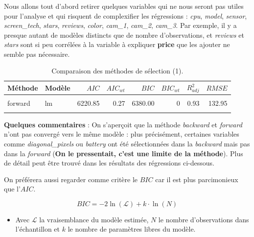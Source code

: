 \documentclass[
  12pt,
]{report}
\providecommand{\tightlist}{%
  \setlength{\itemsep}{0pt}\setlength{\parskip}{0pt}}\usepackage{longtable,booktabs,array}
\begin{document}
Nous allons tout d'abord retirer quelques variables qui ne nous seront
pas utiles pour l'analyse et qui risquent de complexifier les
régressions : \emph{cpu}, \emph{model}, \emph{sensor},
\emph{screen\_tech}, \emph{stars}, \emph{reviews}, \emph{color},
\emph{cam\_1}, \emph{cam\_2}, \emph{cam\_3}. Par exemple, il y a presque
autant de modèles distincts que de nombre d'observations, et
\emph{reviews} et \emph{stars} sont si peu corrélées à la variable à
expliquer \textbf{price} que les ajouter ne semble pas nécessaire.

\begin{table}[!h]

\caption{\label{tab:kable_perf}Comparaison des méthodes de sélection (1).}
\centering
\begin{tabular}[t]{llrrrrrr}
\toprule
\textbf{Méthode} & \textbf{Modèle} & \textbf{$AIC$} & \textbf{$AIC_{wt}$} & \textbf{$BIC$} & \textbf{$BIC_{wt}$} & \textbf{$R^2_{adj}$} & \textbf{$RMSE$}\\
\midrule
\cellcolor{gray!6}{backward} & \cellcolor{gray!6}{lm} & \cellcolor{gray!6}{6218.90} & \cellcolor{gray!6}{0.72} & \cellcolor{gray!6}{6386.43} & \cellcolor{gray!6}{0} & \cellcolor{gray!6}{0.93} & \cellcolor{gray!6}{132.14}\\
forward & lm & 6220.85 & 0.27 & 6380.00 & 0 & 0.93 & 132.95\\
\cellcolor{gray!6}{genetic} & \cellcolor{gray!6}{lm} & \cellcolor{gray!6}{6229.89} & \cellcolor{gray!6}{0.00} & \cellcolor{gray!6}{6363.91} & \cellcolor{gray!6}{1} & \cellcolor{gray!6}{0.92} & \cellcolor{gray!6}{135.85}\\
\bottomrule
\end{tabular}
\end{table}

\textbf{Quelques commentaires} : On s'aperçoit que la méthode
\emph{backward} et \emph{forward} n'ont pas convergé vers le même modèle
: plus précisément, certaines variables comme \emph{diagonal\_pixels} ou
\emph{battery} ont été sélectionnées dans la \emph{backward} mais pas
dans la \emph{forward} (\textbf{On le pressentait, c'est une limite de
la méthode}). Plus de détail peut être trouvé dans les résultats des
régressions ci-dessous.

On préférera aussi regarder comme critère le \(BIC\) car il est plus
parcimonieux que l'\(AIC\).

\[ BIC = -2\ln(\mathcal{L}) + k \cdot \ln(N) \]

\begin{itemize}
\tightlist
\item
  Avec \(\mathcal{L}\) la vraisemblance du modèle estimée, \(N\) le
  nombre d'observations dans l'échantillon et \(k\) le nombre de
  paramètres libres du modèle.
\end{itemize}
\end{document}
